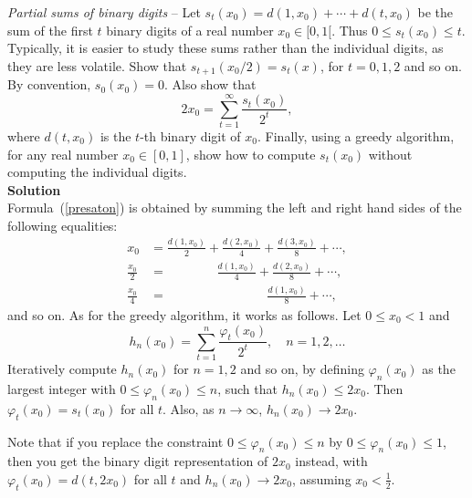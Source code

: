 \documentclass[oneside,10pt]{book}
\begin{document}
\begin{Exercise}\label{kn5z21990fr} {\em Partial sums of binary digits} --  Let $s_t(x_0) = d(1,x_0) +\cdots + d(t,x_0)$ be the sum of the first $t$ binary digits of a real number $x_0\in [0, 1[$. Thus $0\leq s_t(x_0)\leq t$. Typically, it is easier to study these sums rather than the individual digits, as they are less volatile.  Show that $s_{t+1}(x_0/2) = s_t(x)$, for $t=0,1,2$ and so on.  By convention, $s_0(x_0)=0$. Also show that
\begin{equation}
 2x_0 = \sum_{t=1}^\infty \frac{s_t(x_0)}{2^t}, \label{presaton}
\end{equation}
where $d(t,x_0)$ is the $t$-th binary digit of $x_0$. Finally, using a \textcolor{index}{greedy algorithm}, for any real number $x_0\in[0, 1]$, show how to compute $s_t(x_0)$ without computing the individual digits.\vspace{1ex} \\
{\bf Solution} \\
Formula~(\ref{presaton}) is obtained by summing the left and right hand sides of the following equalities:
\begin{align}
x_0 & = \frac{d(1,x_0)}{2} +  \frac{d(2,x_0)}{4}+ \frac{d(3,x_0)}{8} + \cdots, \nonumber \\
\frac{x_0}{2} & =   \hspace{47pt}  \frac{d(1,x_0)}{4} +  \frac{d(2,x_0)}{8} + \cdots, \nonumber \\
\frac{x_0}{4} & =   \hspace{94pt}   \frac{d(1,x_0)}{8} + \cdots, \nonumber
\end{align}
and so on. As for the greedy algorithm, it works as follows. Let $0\leq x_0<1$ and
$$
h_n(x_0) = \sum_{t=1}^n \frac{\varphi_t(x_0)}{2^t}, \quad n=1,2,\dots
$$
Iteratively compute $h_n(x_0)$ for $n=1,2$ and so on, by defining
$\varphi_{n}(x_0)$ as the largest integer with $0\leq \varphi_{n}(x_0)\leq n$, such that $h_{n}(x_0) \leq 2x_0$. Then
 $\varphi_{t}(x_0)= s_t(x_0)$ for all $t$. Also, as $n\rightarrow\infty$, $h_n(x_0)\rightarrow 2x_0$.

Note that if you replace
the constraint $0\leq \varphi_{n}(x_0)\leq n$ by $0\leq \varphi_{n}(x_0)\leq 1$,
then you get the binary digit representation of
 $2x_0$ instead, with $\varphi_{t}(x_0)= d(t, 2x_0)$ for all $t$ and $h_n(x_0)\rightarrow 2x_0$, assuming $x_0<\frac{1}{2}$.
\end{Exercise}
\end{document}
